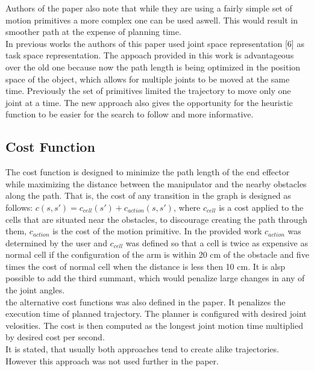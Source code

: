 \documentclass[11pt]{article}
\begin{document}
Authors of the paper also note that while they are using a fairly simple set of motion primitives a more complex one can be used aswell. This would result in smoother path at the expense of planning time.\\
In previous works the authors of this paper used joint space representation [6] as task space representation. The appoach provided in this work is advantageous over the old one because now the path length is being optimized in the position space of the object, which allows for multiple joints to be moved at the same time. Previously the set of primitives limited the trajectory to move only one joint at a time. The new approach also gives the opportunity for the heuristic function to be easier for the search to follow and more informative.
\subsection{Cost Function}
The cost function is designed to minimize the path length of the end effector while maximizing the distance between the manipulator and the nearby obstacles along the path. That is, the cost of any transition in the graph is designed as follows: $c(s,s')=c_{cell}(s')+c_{action}(s,s')$, where $c_{cell}$ is a cost applied to the cells that are situated near the obstacles, to discourage creating the path through them, $c_{action}$ is the cost of the motion primitive. In the provided work $c_{action}$ was determined by the user and $c_{cell}$ was defined so that a cell is twice as expensive as normal cell if the configuration of the arm is within 20 cm of the obstacle and five times the cost of normal cell when the distance is less then 10 cm. It is alsp possible to add the third summant, which would penalize large changes in any of the joint angles.\\
the alternative cost functions was also defined in the paper. It penalizes the execution time of planned trajectory. The planner is configured with desired joint velosities. The cost is then computed as the longest joint motion time multiplied by desired cost per second.\\
It is stated, that usually both approaches tend to create alike trajectories. However this approach was not used further in the paper.\\
\end{document}

